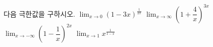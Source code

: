 다음 극한값을 구하시오.
 $\displaystyle\lim_{x\to 0}(1-3x)^{\frac{1}{2x}}$
 $\displaystyle\lim_{x\to\infty}\left(1+\dfrac{4}{x}\right)^{3x}$
 $\displaystyle\lim_{x\to-\infty}\left(1-\dfrac{1}{x}\right)^{2x}$
 $\displaystyle\lim_{x\to 1}x^{\frac{1}{1-x}}$
